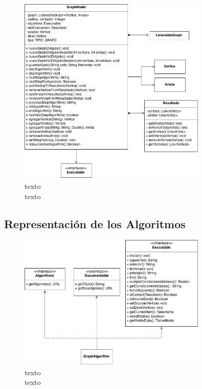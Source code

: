 \documentclass{book}
\begin{document}
\begin{figure}[H]
	\centering
	\includegraphics[width=0.8\textwidth]{images/01-03.png}
	\medskip
	\caption{texto \\ texto}
	\medskip
\end{figure}
\bigskip


\subsection{Representación de los Algoritmos}


\begin{figure}[H]
	\centering
	\includegraphics[width=0.8\textwidth]{images/01-02.png}
	\medskip
	\caption{texto \\ texto}
	\medskip
\end{figure}
\bigskip
\end{document}
